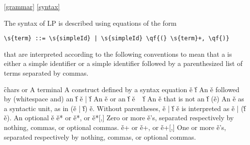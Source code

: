 \ref{grammar}
\ref{syntax}

The syntax of LP is described using equations of the form
\begin{verbatim}
\s{term} ::= \s{simpleId} | \s{simpleId} \qf{(} \s{term}+, \qf{)}
\end{verbatim}
that are interpreted according to the following conventions to mean that a
 is either a simple identifier or a simple identifier followed by
a parenthesized list of terms separated by commas.

\begin{description}
\dt \f{chars} or 
\dd A terminal 
\dt {}
\dd A construct defined by a syntax equation
\dt \v{e} \v{f}               
\dd An \v{e} followed by (whitespace and) an \v{f}
\dt \v{e} | \v{f}
\dd An \v{e} or an \v{f}
\dt \v{e} ~ \v{f}
\dd An \v{e} that is not an \v{f}
\dt (\v{e})
\dd An \v{e} as a syntactic unit, as in (\v{e} | \v{f}) \v{e}.  Without
parentheses, \v{e} | \v{f} \v{e} is interpreted as \v{e} | (\v{f} \v{e}).
\dt [\v{e}]
\dd An optional \v{e}
\dt \v{e}* or \v{e}*, or \v{e}*[,]
\dd Zero or more \v{e}'s, separated respectively by nothing, commas, or
optional commas.
\dt \v{e}+ or \v{e}+, or \v{e}+[,]
\dd One or more \v{e}'s,  separated respectively by nothing, commas, or
optional commas.
\end{description}
